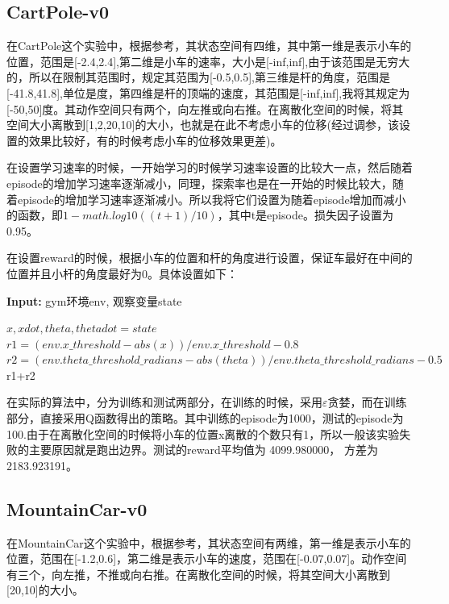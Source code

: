 \documentclass[a4paper,UTF8]{article}
\theoremstyle{definition}
\begin{document}
\subsection*{CartPole-v0}

在CartPole这个实验中，根据参考\cite{github:cartpole}，其状态空间有四维，其中第一维是表示小车的位置，范围是[-2.4,2.4],第二维是小车的速率，大小是[-inf,inf],由于该范围是无穷大的，所以在限制其范围时，规定其范围为[-0.5,0.5],第三维是杆的角度，范围是[-41.8,41.8],单位是度，第四维是杆的顶端的速度，其范围是[-inf,inf],我将其规定为[-50,50]度。其动作空间只有两个，向左推或向右推。在离散化空间的时候，将其空间大小离散到[1,2,20,10]的大小，也就是在此不考虑小车的位移(经过调参，该设置的效果比较好，有的时候考虑小车的位移效果更差)。

在设置学习速率的时候，一开始学习的时候学习速率设置的比较大一点，然后随着episode的增加学习速率逐渐减小，同理，探索率也是在一开始的时候比较大，随着episode的增加学习速率逐渐减小。所以我将它们设置为随着episode增加而减小的函数，即$1-math.log10((t+1)/10)$，其中t是episode。损失因子设置为0.95。

在设置reward的时候，根据小车的位置和杆的角度进行设置，保证车最好在中间的位置并且小杆的角度最好为0。具体设置如下：
\begin{algorithm}

\hspace*{0.02in} {\bf Input:}
gym环境env, 观察变量state
\begin{algorithmic}[1]
\State $x,xdot,theta,thetadot = state$
\State $r1 = (env.x\_threshold - abs(x)) / env.x\_threshold - 0.8$
\State $r2 = (env.theta\_threshold\_radians - abs(theta)) / env.theta\_threshold\_radians - 0.5$
\State \Return r1+r2

\end{algorithmic}
\end{algorithm}

在实际的算法中，分为训练和测试两部分，在训练的时候，采用$\varepsilon$贪婪，而在训练部分，直接采用Q函数得出的策略。其中训练的episode为1000，测试的episode为100.由于在离散化空间的时候将小车的位置x离散的个数只有1，所以一般该实验失败的主要原因就是跑出边界。测试的reward平均值为 4099.980000， 方差为2183.923191。

\subsection*{MountainCar-v0}

在MountainCar这个实验中，根据参考\cite{github:mountaincar}，其状态空间有两维，第一维是表示小车的位置，范围在[-1.2,0.6]，第二维是表示小车的速度，范围在[-0.07,0.07]。动作空间有三个，向左推，不推或向右推。在离散化空间的时候，将其空间大小离散到[20,10]的大小。
\end{document}
